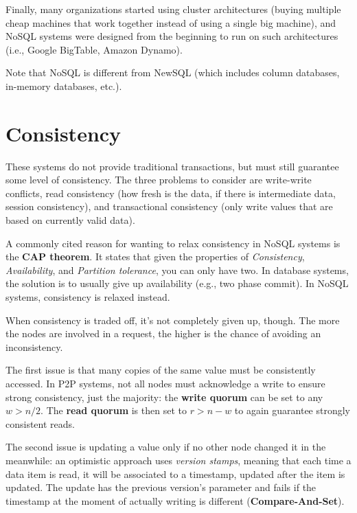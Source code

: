 Finally, many organizations started using cluster architectures (buying multiple cheap machines that work together instead of using a single big machine), and NoSQL systems were designed from the beginning to run on such architectures (i.e., Google BigTable, Amazon Dynamo).

Note that NoSQL is different from NewSQL (which includes column databases, in-memory databases, etc.).

\section{Consistency}

These systems do not provide traditional transactions, but must still guarantee some level of consistency. The three problems to consider are write-write conflicts, read consistency (how fresh is the data, if there is intermediate data, session consistency), and transactional consistency (only write values that are based on currently valid data).

A commonly cited reason for wanting to relax consistency in NoSQL systems is the \textbf{CAP theorem}. It states that given the properties of \textit{Consistency}, \textit{Availability}, and \textit{Partition tolerance}, you can only have two. In database systems, the solution is to usually give up availability (e.g., two phase commit). In NoSQL systems, consistency is relaxed instead.

When consistency is traded off, it's not completely given up, though. The more the nodes are involved in a request, the higher is the chance of avoiding an inconsistency. 

The first issue is that many copies of the same value must be consistently accessed. In P2P systems, not all nodes must acknowledge a write to ensure strong consistency, just the majority: the \textbf{write quorum} can be set to any $w > n/2$. The \textbf{read quorum} is then set to $r > n - w$ to again guarantee strongly consistent reads.

The second issue is updating a value only if no other node changed it in the meanwhile: an optimistic approach uses \textit{version stamps}, meaning that each time a data item is read, it will be associated to a timestamp, updated after the item is updated. The update has the previous version's parameter and fails if the timestamp at the moment of actually writing is different (\textbf{Compare-And-Set}).

